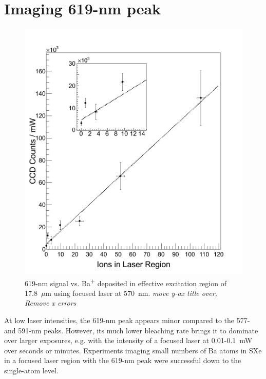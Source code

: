 \section{Imaging 619-nm peak}

\begin{figure} %
        \centering
                \includegraphics[width=.99\textwidth]{figures/fitgrouped_20150807_20150916_inset.png}
                \caption{619-nm signal vs. Ba\textsuperscript{+} deposited in effective excitation region of 17.8~$\mu$m using focused laser at 570~nm. \emph{\color{red}move y-ax title over, Remove x errors}}
\label{fig:lin}
\end{figure}

At low laser intensities, the 619-nm peak appears minor compared to the 577- and 591-nm peaks.  However, its much lower bleaching rate brings it to dominate over larger exposures, e.g. with the intensity of a focused laser at 0.01-0.1~mW over seconds or minutes.  Experiments imaging small numbers of Ba atoms in SXe in a focused laser region with the 619-nm peak were successful down to the single-atom level.

